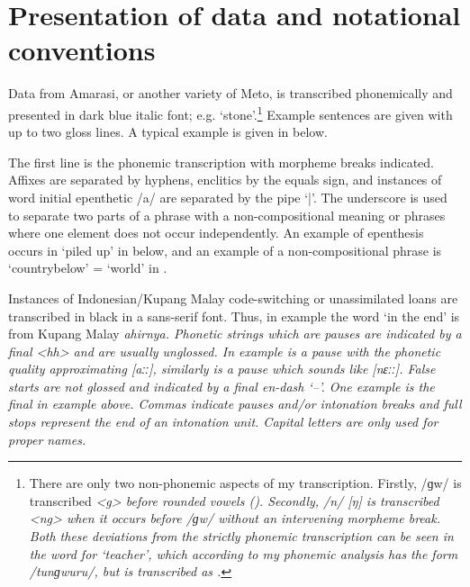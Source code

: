 \section{Presentation of data and notational conventions}\label{sec:PreDat}
Data from Amarasi, or another variety of Meto,
is transcribed phonemically and presented in dark blue italic font; e.g.  `stone'.\footnote{
		There are only two non-phonemic aspects of my transcription.
		Firstly, /ɡw/ is transcribed \it{<g>} before rounded vowels ().
		Secondly, /n/ {\ra} [ŋ] is transcribed \it{<ng>} when it occurs before /ɡw/
		without an intervening morpheme break.
		Both these deviations from the strictly phonemic transcription
		can be seen in the word for `teacher',
		which according to my phonemic analysis has the form /tunɡwuru/,
		but is transcribed as .}
Example sentences are given with up to two gloss lines.
A typical example is given in  below.

\begin{exe}
	\label{ex:120715-4, 0.55 ch:Intr}
\end{exe}

The first line is the phonemic transcription with morpheme breaks indicated.
Affixes are separated by hyphens, enclitics by the equals sign,
and instances of word initial epenthetic /a/ are separated by the pipe `|'.
The underscore {\gap} is used to separate two parts of a phrase with
a non-compositional meaning or phrases where
one element does not occur independently.
An example of epenthesis occurs in 
`piled up' in  below,
and an example of a non-compositional phrase is
 `country{\gap}below' = `world'
in .

Instances of Indonesian/Kupang Malay code-switching or unassimilated loans 
are transcribed in black in a sans-serif font.
Thus, in example  the word
 `in the end' is from Kupang Malay \it{ahirnya}.
Phonetic strings which are pauses are indicated by a final \it{<hh>} and are usually unglossed.
In example   is a pause
with the phonetic quality approximating [aːː],
similarly  is a pause which sounds like [nɛːː].
False starts are not glossed and indicated by a final en-dash `--'.
One example is the final  in example  above.
Commas indicate pauses and/or intonation breaks
and full stops represent the end of an intonation unit.
Capital letters are only used for proper names.

